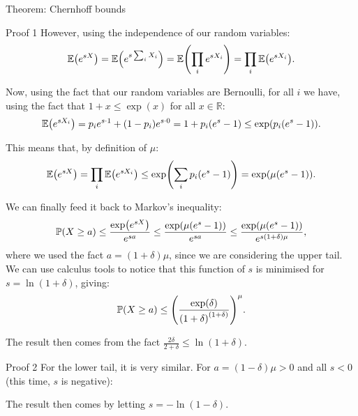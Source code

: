 \documentclass[a4paper]{article}
\begin{document}
\begin{parag}{Theorem: Chernhoff bounds}
\begin{subparag}{Proof 1}
        However, using the independence of our random variables: 
        \[\exval\left(e^{sX}\right) = \exval\left(e^{s \sum_{i} X_i}\right) = \exval\left(\prod_{i} e^{s X_i}\right) = \prod_{i} \exval\left(e^{s X_i}\right).\]
        
        Now, using the fact that our random variables are Bernoulli, for all $i$ we have, using the fact that $1 + x \leq \exp\left(x\right)$ for all $x \in \mathbb{R}$: 
        \[\exval\left(e^{s X_i}\right) = p_i e^{s\cdot 1} + \left(1 - p_i\right)e^{s\cdot 0} = 1 + p_i \left(e^s - 1\right) \leq \exp\left(p_i\left(e^s - 1\right)\right).\]
        
        This means that, by definition of $\mu$:
        \[\exval\left(e^{sX}\right) = \prod_{i} \exval\left(e^{s X_i}\right) \leq \exp\left(\sum_{i} p_i \left(e^s - 1\right)\right) = \exp\left(\mu \left(e^s - 1\right)\right).\]
        
        We can finally feed it back to Markov's inequality: 
        \[\prob\left(X \geq a\right) \leq \frac{\exp\left(e^{s X}\right)}{e^{sa}} \leq \frac{\exp\left(\mu\left(e^s - 1\right)\right)}{e^{sa}} \leq \frac{\exp\left(\mu\left(e^s - 1\right)\right)}{e^{s \left(1 + \delta\right) \mu}},\]
        where we used the fact $a = \left(1 + \delta\right)\mu$, since we are considering the upper tail. We can use calculus tools to notice that this function of $s$ is minimised for $s = \ln\left(1 + \delta\right)$, giving: 
        \[\prob\left(X \geq a\right) \leq \left(\frac{\exp\left(\delta\right)}{\left(1 + \delta\right)^{\left(1 + \delta\right)}}\right)^{\mu}.\]

        The result then comes from the fact $\frac{2 \delta}{2 + \delta} \leq \ln\left(1 + \delta\right)$.
    \end{subparag}

    \begin{subparag}{Proof 2}
        For the lower tail, it is very similar. For $a = \left(1 - \delta\right)\mu > 0$ and all $s < 0$ (this time, $s$ is negative): 

        The result then comes by letting $s = -\ln\left(1 - \delta\right)$.
    \end{subparag}
\end{parag}
\end{document}
